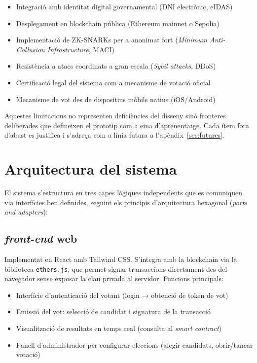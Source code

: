 \documentclass[12pt,a4paper,catalan]{article}
\begin{document}
\begin{itemize}
    \item[$\times$] Integració amb identitat digital governamental (DNI electrònic, eIDAS)
    \item[$\times$] Desplegament en blockchain pública (Ethereum mainnet o Sepolia)
    \item[$\times$] Implementació de ZK-SNARKs per a anonimat fort (\textit{Minimum Anti-Collusion Infrastructure}, MACI)
    \item[$\times$] Resistència a atacs coordinats a gran escala (\textit{Sybil attacks}, DDoS)
    \item[$\times$] Certificació legal del sistema com a mecanisme de votació oficial
    \item[$\times$] Mecanisme de vot des de dispositius mòbils natius (iOS/Android)
\end{itemize}

Aquestes limitacions no representen deficiències del disseny sinó fronteres deliberades que defineixen el prototip com a eina d'aprenentatge. Cada ítem fora d'abast es justifica i s'adreça com a línia futura a l'apèndix~\ref{sec:futures}.

\section{Arquitectura del sistema}

El sistema s'estructura en tres capes lògiques independents que es comuniquen via interfícies ben definides, seguint els principis d'arquitectura hexagonal (\textit{ports and adapters}):

\subsection{\textit{front-end} web}

Implementat en React amb Tailwind CSS. S'integra amb la blockchain via la biblioteca \texttt{ethers.js}, que permet signar transaccions directament des del navegador sense exposar la clau privada al servidor. Funcions principals:

\begin{itemize}
    \item Interfície d'autenticació del votant (login → obtenció de token de vot)
    \item Emissió del vot: selecció de candidat i signatura de la transacció
    \item Visualització de resultats en temps real (consulta al \textit{smart contract})
    \item Panell d'administrador per configurar eleccions (afegir candidats, obrir/tancar votació)
\end{itemize}
\end{document}
